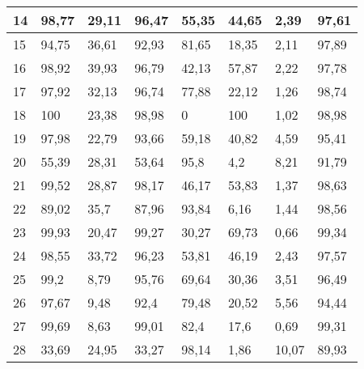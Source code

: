 \begin{longtable}[c]{|l|l|l|l|l|l|l|l|}
14              & 98,77        & 29,11        & 96,47       & 55,35         & 44,65         & 2,39          & 97,61         \\ \hline
15              & 94,75        & 36,61        & 92,93       & 81,65         & 18,35         & 2,11          & 97,89         \\ \hline
16              & 98,92        & 39,93        & 96,79       & 42,13         & 57,87         & 2,22          & 97,78         \\ \hline
17              & 97,92        & 32,13        & 96,74       & 77,88         & 22,12         & 1,26          & 98,74         \\ \hline
18              & 100          & 23,38        & 98,98       & 0             & 100           & 1,02          & 98,98         \\ \hline
19              & 97,98        & 22,79        & 93,66       & 59,18         & 40,82         & 4,59          & 95,41         \\ \hline
20              & 55,39        & 28,31        & 53,64       & 95,8          & 4,2           & 8,21          & 91,79         \\ \hline
21              & 99,52        & 28,87        & 98,17       & 46,17         & 53,83         & 1,37          & 98,63         \\ \hline
22              & 89,02        & 35,7         & 87,96       & 93,84         & 6,16          & 1,44          & 98,56         \\ \hline
23              & 99,93        & 20,47        & 99,27       & 30,27         & 69,73         & 0,66          & 99,34         \\ \hline
24              & 98,55        & 33,72        & 96,23       & 53,81         & 46,19         & 2,43          & 97,57         \\ \hline
25              & 99,2         & 8,79         & 95,76       & 69,64         & 30,36         & 3,51          & 96,49         \\ \hline
26              & 97,67        & 9,48         & 92,4        & 79,48         & 20,52         & 5,56          & 94,44         \\ \hline
27              & 99,69        & 8,63         & 99,01       & 82,4          & 17,6          & 0,69          & 99,31         \\ \hline
28              & 33,69        & 24,95        & 33,27       & 98,14         & 1,86          & 10,07         & 89,93         \\ \hline

\end{longtable}
